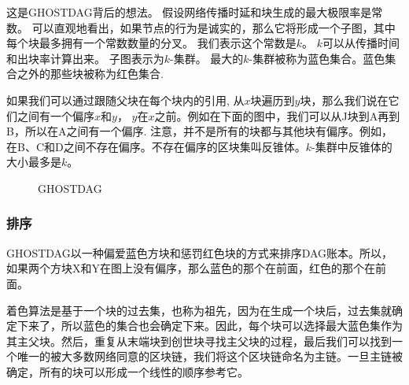 \documentclass[a4paper,11pt]{article}
\begin{document}
这是GHOSTDAG背后的想法。
假设网络传播时延和块生成的最大极限率是常数。
可以直观地看出，如果节点的行为是诚实的，那么它将形成一个子图，其中每个块最多拥有一个常数数量的分叉。
我们表示这个常数是$k$。
$k$可以从传播时间和出块率计算出来。
子图表示为$k$-集群。
最大的$k$-集群被称为蓝色集合。蓝色集合之外的那些块被称为红色集合.


如果我们可以通过跟随父块在每个块内的引用, 从$x$块遍历到$y$块，那么我们说在它们之间有一个偏序$x$和$y$， $y$在$x$之前。例如在下面的图中，我们可以从J块到A再到B，所以在A之间有一个偏序. 注意，并不是所有的块都与其他块有偏序。例如，在B、C和D之间不存在偏序。不存在偏序的区块集叫反锥体。$k$-集群中反锥体的大小最多是$k$。


\begin{figure}[ht]
	\centerline{%
	}
\caption{GHOSTDAG}
\end{figure}


\subsubsection{排序}

GHOSTDAG以一种偏爱蓝色方块和惩罚红色块的方式来排序DAG账本。所以，如果两个方块X和Y在图上没有偏序，那么蓝色的那个在前面，红色的那个在前面。

着色算法是基于一个块的过去集，也称为祖先，因为在生成一个块后，过去集就确定下来了，所以蓝色的集合也会确定下来。因此，每个块可以选择最大蓝色集作为其主父块。然后，重复从末端块到创世块寻找主父块的过程，最后我们可以找到一个唯一的被大多数网络同意的区块链，我们将这个区块链命名为主链。一旦主链被确定，所有的块可以形成一个线性的顺序参考它。
\end{document}
